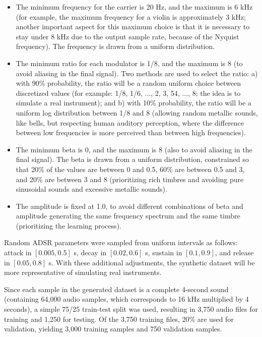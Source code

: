 \documentclass[10pt,conference]{IEEEtran}
\begin{document}
\begin{itemize}
    \item The minimum frequency for the carrier is 20 Hz, and the maximum is 6 kHz (for example, the maximum frequency for a violin is approximately 3 kHz; another important aspect for this maximum choice is that it is necessary to stay under 8 kHz due to the output sample rate, because of the Nyquist frequency). The frequency is drawn from a uniform distribution.
    \item The minimum ratio for each modulator is 1/8, and the maximum is 8 (to avoid aliasing in the final signal). Two methods are used to select the ratio: a) with 90\% probability, the ratio will be a random uniform choice between discretized values (for example: 1/8, 1/6, ..., 2, 3, 54, ..., 8; the idea is to simulate a real instrument); and b) with 10\% probability, the ratio will be a uniform log distribution between 1/8 and 8 (allowing random metallic sounds, like bells, but respecting human auditory perception, where the difference between low frequencies is more perceived than between high frequencies).
    \item The minimum beta is 0, and the maximum is 8 (also to avoid aliasing in the final signal). The beta is drawn from a uniform distribution, constrained so that 20\% of the values are between 0 and 0.5, 60\% are between 0.5 and 3, and 20\% are between 3 and 8 (prioritizing rich timbres and avoiding pure sinusoidal sounds and excessive metallic sounds).
    \item The amplitude is fixed at 1.0, to avoid different combinations of beta and amplitude generating the same frequency spectrum and the same timbre (prioritizing the learning process).
\end{itemize}

Random ADSR parameters were sampled from uniform intervals as follows: attack in $[0.005, 0.5]$ s, decay in $[0.02, 0.6]$ s, sustain in $[0.1, 0.9]$, and release in $[0.05, 0.8]$ s. With these additional adjustments, the synthetic dataset will be more representative of simulating real instruments.

Since each sample in the generated dataset is a complete 4-second sound (containing 64,000 audio samples, which corresponds to 16 kHz multiplied by 4 seconds), a simple 75/25 train-test split was used, resulting in 3,750 audio files for training and 1,250 for testing. Of the 3,750 training files, 20\% are used for validation, yielding 3,000 training samples and 750 validation samples.
\end{document}

